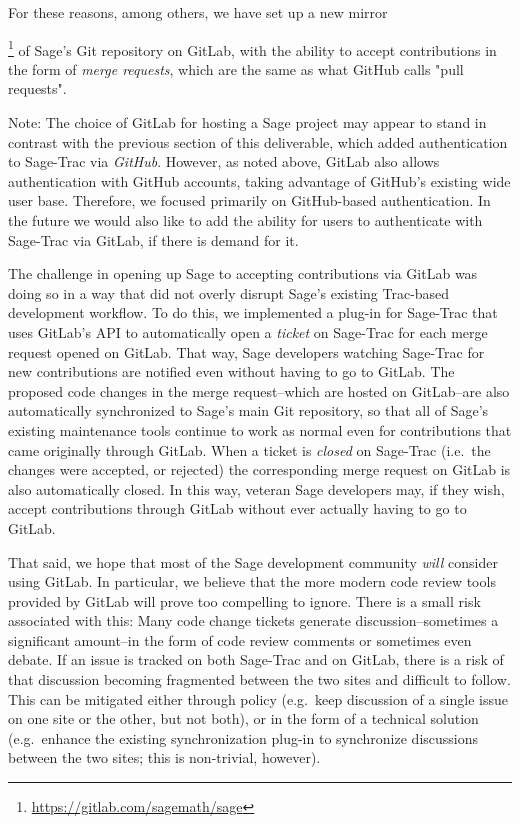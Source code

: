 For these reasons, among others, we have set up a new
mirror{\footnote{\url{https://gitlab.com/sagemath/sage}} of Sage's Git
repository on GitLab, with the ability to accept contributions in the form of
{\em merge requests}, which are the same as what GitHub calls "pull requests".

Note: The choice of GitLab for hosting a Sage project may appear to stand in
contrast with the previous section of this deliverable, which added
authentication to Sage-Trac via {\em GitHub}.  However, as noted above, GitLab
also allows authentication with GitHub accounts, taking advantage of GitHub's
existing wide user base.  Therefore, we focused primarily on GitHub-based
authentication.  In the future we would also like to add the ability for users
to authenticate with Sage-Trac via GitLab, if there is demand for it.

The challenge in opening up Sage to accepting contributions via GitLab was
doing so in a way that did not overly disrupt Sage's existing Trac-based
development workflow.  To do this, we implemented a plug-in for Sage-Trac that
uses GitLab's API to automatically open a {\em ticket} on Sage-Trac for each
merge request opened on GitLab.  That way, Sage developers watching Sage-Trac
for new contributions are notified even without having to go to GitLab.  The
proposed code changes in the merge request--which are hosted on GitLab--are
also automatically synchronized to Sage's main Git repository, so that all of
Sage's existing maintenance tools continue to work as normal even for
contributions that came originally through GitLab.  When a ticket is {\em
closed} on Sage-Trac (i.e.~the changes were accepted, or rejected) the
corresponding merge request on GitLab is also automatically closed.  In this
way, veteran Sage developers may, if they wish, accept contributions through
GitLab without ever actually having to go to GitLab.

That said, we hope that most of the Sage development community {\em will}
consider using GitLab.  In particular, we believe that the more modern code
review tools provided by GitLab will prove too compelling to ignore.  There
is a small risk associated with this: Many code change tickets generate 
discussion--sometimes a significant amount--in the form of code review comments
or sometimes even debate.  If an issue is tracked on both Sage-Trac and on
GitLab, there is a risk of that discussion becoming fragmented between the two
sites and difficult to follow.  This can be mitigated either through policy
(e.g.~keep discussion of a single issue on one site or the other, but not
both), or in the form of a technical solution (e.g.~enhance the existing
synchronization plug-in to synchronize discussions between the two sites; this
is non-trivial, however).

}

